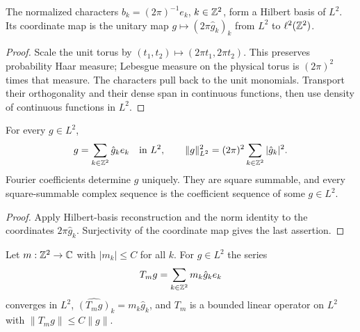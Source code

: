 \begin{lemma}
\label{lem:torus-fourier-basis}
\leanok
The normalized characters $b_k=(2\pi)^{-1}e_k$, $k\in\mathbb{Z}^2$, form a Hilbert
basis of $L^2$. Its coordinate map is the unitary map
$g\mapsto(2\pi\hat g_k)_k$ from $L^2$ to $\ell^2(\mathbb{Z}^2)$.
\end{lemma}

\begin{proof}
\leanok
Scale the unit torus by $(t_1,t_2)\mapsto(2\pi t_1,2\pi t_2)$.
This preserves probability Haar measure; Lebesgue measure on the physical
torus is $(2\pi)^2$ times that measure. The characters pull back to the unit
monomials. Transport their orthogonality and their dense span in continuous
functions, then use density of continuous functions in $L^2$.
\end{proof}

\begin{lemma}
\label{lem:torus-fourier}
\leanok
For every $g\in L^2$,
\[
  g=\sum_{k\in\mathbb{Z}^2}\hat g_k e_k\quad\text{in }L^2,
  \qquad \|g\|_{L^2}^2=(2\pi)^2\sum_{k\in\mathbb{Z}^2}|\hat g_k|^2.
\]
Fourier coefficients determine $g$ uniquely. They are square summable, and
every square-summable complex sequence is the coefficient sequence of some
$g\in L^2$.
\end{lemma}

\begin{proof}
\leanok
Apply Hilbert-basis reconstruction and the norm identity to the coordinates
$2\pi\hat g_k$. Surjectivity of the coordinate map gives the last assertion.
\end{proof}

\begin{lemma}
\label{lem:fourier-multiplier}
\leanok
Let $m:\mathbb{Z}^2\to\mathbb{C}$ with $|m_k|\le C$ for all $k$. For $g\in L^2$ the series
\[
  T_mg=\sum_{k\in\mathbb{Z}^2}m_k\hat g_ke_k
\]
converges in $L^2$, $\widehat{(T_mg)}_k=m_k\hat g_k$, and $T_m$ is a bounded
linear operator on $L^2$ with $\|T_mg\|\le C\|g\|$.
\end{lemma}

